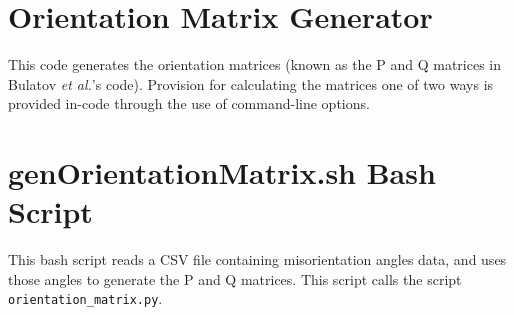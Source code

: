\documentclass[12pt]{report}
\begin{document}
\chapter{Orientation Matrix Generator\label{app:OrientationMatrix}}
This code generates the orientation matrices (known as the P and Q matrices in Bulatov \emph{et al.}'s code). Provision for calculating the matrices one of two ways is provided in-code through the use of command-line options.



\chapter{genOrientationMatrix.sh Bash Script\label{app:genOrientationMatrix}}
This bash script reads a CSV file containing misorientation angles data, and uses those angles to generate the P and Q matrices.  This script calls the script \lstinline!orientation_matrix.py!.


\end{document}
